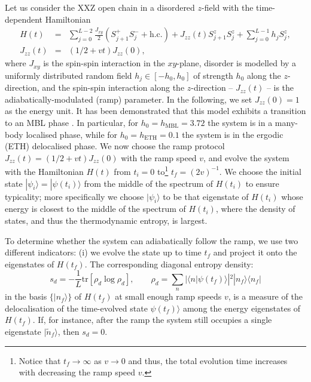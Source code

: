 \documentclass{SciPost}
\newcommand\0{\scalebox{-1}[1]{0}}
\begin{document}
Let us consider the XXZ open chain in a disordered $z$-field with the time-dependent Hamiltonian
\begin{eqnarray}
H(t) &=& \sum_{j=0}^{L-2}\frac{J_{xy}}{2}\left(S^+_{j+1}S^-_{j} + \mathrm{h.c.}\right) + J_{zz}(t)S^z_{j+1}S^z_{j} + \sum_{j=0}^{L-1}h_jS^z_{j},\nonumber\\
J_{zz}(t) &=&(1/2 + vt)J_{zz}(0),
\label{eq:H_XXZ}
\end{eqnarray}
where $J_{xy}$ is the spin-spin interaction in the $xy$-plane, disorder is modelled by a uniformly distributed random field $h_j\in[-h_0,h_0]$ of strength $h_0$ along the $z$-direction, and the spin-spin interaction along the $z$-direction -- $J_{zz}(t)$ -- is the adiabatically-modulated (ramp) parameter. In the following, we set $J_{zz}(0) = 1$ as the energy unit. It has been demonstrated that this model exhibits a transition to an MBL phase \cite{Luitz15}. In particular, for $h_0=h_\mathrm{MBL}=3.72$ the system is in a many-body localised phase, while for $h_0=h_\mathrm{ETH}=0.1$ the system is in the ergodic (ETH) delocalised phase. We now choose the ramp protocol $J_{zz}(t)=(1/2 + vt)J_{zz}(0)$ with the ramp speed $v$, and evolve the system with the Hamiltonian $H(t)$ from $t_i=0$ to\footnote{Notice that $t_f\to\infty$ as $v\to 0$ and thus, the total evolution time increases with decreasing the ramp speed $v$.} $t_f=(2v)^{-1}$. We choose the initial state $|\psi_i\rangle=|\psi(t_i)\rangle$ from the middle of the spectrum of $H(t_i)$ to ensure typicality; more specifically we choose $|\psi_i\rangle$ to be that eigenstate of $H(t_i)$ whose energy is closest to the middle of the spectrum of $H(t_i)$, where the density of states, and thus the thermodynamic entropy, is largest.  

To determine whether the system can adiabatically follow the ramp, we use two different indicators: (i) we evolve the state up to time $t_f$ and project it onto the eigenstates of $H(t_f)$. The corresponding diagonal entropy density:
\begin{equation}
s_d = -\frac{1}{L}\mathrm{tr}\left[\rho_d\log\rho_d\right], \qquad \rho_d=\sum_n |\langle n|\psi(t_f)\rangle|^2 |n_f\rangle\langle n_f|
\end{equation}
in the basis $\{|n_f\rangle\}$ of $H(t_f)$ at small enough ramp speeds $v$, is a measure of the delocalisation of the time-evolved state $\psi(t_f)\rangle$ among the energy eigenstates of $H(t_f)$. If, for instance, after the ramp the system still occupies a single eigenstate $|\tilde n_f\rangle$, then $s_d=0$.
\end{document}
